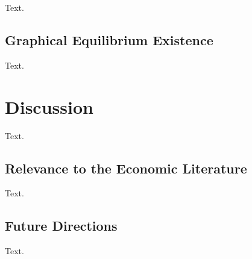 \documentclass[cm,linguex]{glossa}
\begin{document}
Text.

\hypertarget{graphical-equilibrium-existence}{%
\subsection{Graphical Equilibrium
Existence}\label{graphical-equilibrium-existence}}

Text.

\hypertarget{discussion}{%
\section{Discussion}\label{discussion}}

Text.

\hypertarget{relevance-to-the-economic-literature}{%
\subsection{Relevance to the Economic
Literature}\label{relevance-to-the-economic-literature}}

Text.

\hypertarget{future-directions}{%
\subsection{Future Directions}\label{future-directions}}

Text.


\end{document}
